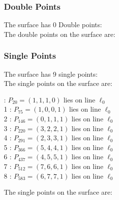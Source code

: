 \documentclass{article}
\begin{document}
{\subsubsection*{Double Points}
The surface has 0 Double points:\\
The double points on the surface are:\\
\begin{multicols}{2}
\noindent
\end{multicols}
\subsubsection*{Single Points}
The surface has 9 single points:\\
The single points on the surface are:\\
\begin{multicols}{2}
 : $P_{20}=( 1, 1, 1, 0 )$ lies on line $\ell_{0}$\\
1 : $P_{75}=( 1, 0, 0, 1 )$ lies on line $\ell_{0}$\\
2 : $P_{146}=( 0, 1, 1, 1 )$ lies on line $\ell_{0}$\\
3 : $P_{220}=( 3, 2, 2, 1 )$ lies on line $\ell_{0}$\\
4 : $P_{291}=( 2, 3, 3, 1 )$ lies on line $\ell_{0}$\\
5 : $P_{366}=( 5, 4, 4, 1 )$ lies on line $\ell_{0}$\\
6 : $P_{437}=( 4, 5, 5, 1 )$ lies on line $\ell_{0}$\\
7 : $P_{512}=( 7, 6, 6, 1 )$ lies on line $\ell_{0}$\\
8 : $P_{583}=( 6, 7, 7, 1 )$ lies on line $\ell_{0}$\\
\end{multicols}
The single points on the surface are:\\
}
\end{document}

